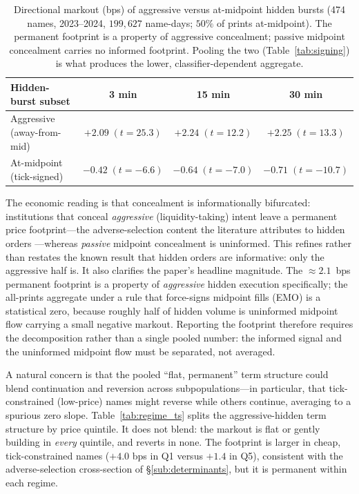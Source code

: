 \documentclass[11pt]{article}
\begin{document}
\begin{table}[htbp]
\centering
\begin{tabular}{lccc}
\toprule
\textbf{Hidden-burst subset} & \textbf{3 min} & \textbf{15 min} & \textbf{30 min} \\
\midrule
Aggressive (away-from-mid) & $+2.09\;(t{=}25.3)$ & $+2.24\;(t{=}12.2)$ & $+2.25\;(t{=}13.3)$ \\
At-midpoint (tick-signed) & $-0.42\;(t{=}{-}6.6)$ & $-0.64\;(t{=}{-}7.0)$ & $-0.71\;(t{=}{-}10.7)$ \\
\bottomrule
\end{tabular}
\caption{Directional markout (bps) of aggressive versus at-midpoint hidden bursts
(474 names, 2023--2024, $199{,}627$ name-days; $50\%$ of prints at-midpoint). The permanent
footprint is a property of aggressive concealment; passive midpoint concealment carries
no informed footprint. Pooling the two (Table~\ref{tab:signing}) is what produces the
lower, classifier-dependent aggregate.}
\label{tab:decomp}
\end{table}

The economic reading is that concealment is informationally bifurcated: institutions that
conceal \emph{aggressive} (liquidity-taking) intent leave a permanent price footprint---the
adverse-selection content the literature attributes to hidden orders
\citep{bessembinder2009}---whereas \emph{passive} midpoint concealment is uninformed. This
refines rather than restates the known result that hidden orders are informative: only the
aggressive half is. It also clarifies the paper's headline magnitude. The $\approx\!2.1$~bps
permanent footprint is a property of \emph{aggressive} hidden execution specifically; the
all-prints aggregate under a rule that force-signs midpoint fills (EMO) is a statistical
zero, because roughly half of hidden volume is uninformed midpoint flow carrying a small
negative markout. Reporting the footprint therefore requires the decomposition rather than
a single pooled number: the informed signal and the uninformed midpoint flow must be
separated, not averaged.

A natural concern is that the pooled ``flat, permanent'' term structure could blend
continuation and reversion across subpopulations---in particular, that tick-constrained
(low-price) names might reverse while others continue, averaging to a spurious zero slope.
Table~\ref{tab:regime_ts} splits the aggressive-hidden term structure by price quintile.
It does not blend: the markout is flat or gently building in \emph{every} quintile, and
reverts in none. The footprint is larger in cheap, tick-constrained names ($+4.0$ bps in
Q1 versus $+1.4$ in Q5), consistent with the adverse-selection cross-section of
\S\ref{sub:determinants}, but it is permanent within each regime.
\end{document}
